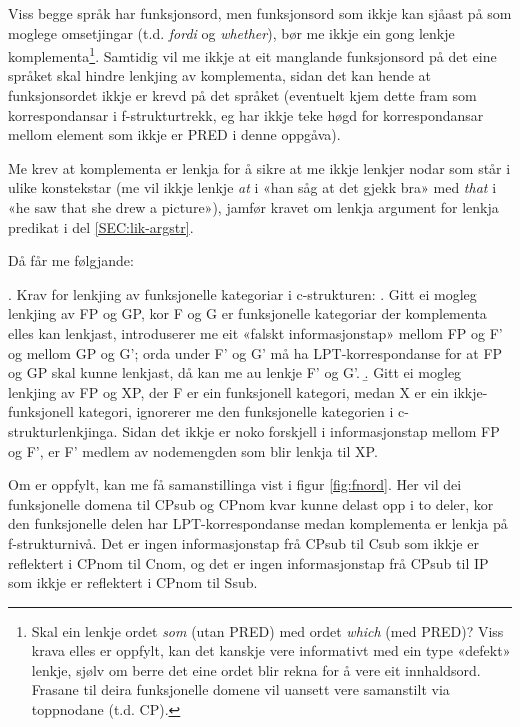 \documentclass[11pt,a4paper,oneside,draft]{book}
\begin{document}
Viss begge språk har funksjonsord, men funksjonsord som ikkje kan
sjåast på som moglege omsetjingar (t.d. \emph{fordi} og \emph{whether}), bør me
ikkje ein gong lenkje komplementa\footnote{Skal ein lenkje ordet \emph{som} (utan PRED) med ordet \emph{which} (med
        PRED)? Viss krava elles er oppfylt, kan det kanskje vere
        informativt med ein type «defekt» lenkje, sjølv om berre det
        eine ordet blir rekna for å vere eit innhaldsord. Frasane til
        deira funksjonelle domene vil uansett vere samanstilt via
        toppnodane (t.d. CP). }. Samtidig vil me ikkje at eit
manglande funksjonsord på det eine språket skal hindre lenkjing av
komplementa, sidan det kan hende at funksjonsordet ikkje er krevd på
det språket (eventuelt kjem dette fram som korrespondansar i
f-strukturtrekk, eg har ikkje teke høgd for korrespondansar mellom
element som ikkje er PRED i denne oppgåva).

Me krev at komplementa er lenkja for å sikre at me ikkje lenkjer nodar
som står i ulike konstekstar (me vil ikkje lenkje \emph{at} i «han såg at
det gjekk bra» med \emph{that} i «he saw that she drew a picture»), jamfør
kravet om lenkja argument for lenkja predikat i del
\ref{SEC:lik-argstr}.

Då får me følgjande:

\ex. \label{fnordkrav} Krav for lenkjing av funksjonelle kategoriar i c-strukturen:
\a. Gitt ei mogleg lenkjing av FP og GP, kor F og G er funksjonelle
    kategoriar der komplementa elles kan lenkjast, introduserer me eit
    «falskt informasjonstap» mellom FP og F' og mellom GP og G'; orda
    under F' og G' må ha LPT-korrespondanse for at FP og GP skal kunne
    lenkjast, då kan me au lenkje F' og G'.  
\b. Gitt ei mogleg lenkjing av FP og XP, der F er ein funksjonell
    kategori, medan X er ein ikkje-funksjonell kategori, ignorerer me
    den funksjonelle kategorien i c-strukturlenkjinga. Sidan det ikkje
    er noko forskjell i informasjonstap mellom FP og F', er F' medlem
    av nodemengden som blir lenkja til XP.



Om \Last[a] er oppfylt, kan me få samanstillinga vist i figur
\ref{fig:fnord}. Her vil dei funksjonelle domena til CPsub og CPnom
kvar kunne delast opp i to deler, kor den funksjonelle delen har
LPT-korrespondanse medan komplementa er lenkja på f-strukturnivå. Det
er ingen informasjonstap frå CPsub til Csub som ikkje er reflektert i
CPnom til Cnom, og det er ingen informasjonstap frå CPsub til IP som
ikkje er reflektert i CPnom til Ssub.
\end{document}
